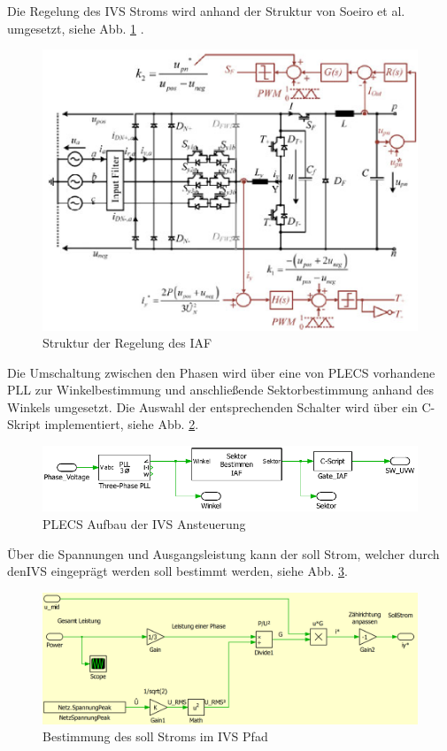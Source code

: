 		Die Regelung des \gls{IVS} Stroms wird anhand der Struktur von Soeiro et al. umgesetzt, siehe Abb. \ref{fig:iafpapercontrol} \cite{Soeiro.2013}. 
		 \begin{figure}[H]
			\centering
			\includegraphics[width=0.7\linewidth]{content/Grafiken/IAF_Paper_Control}
			\caption{Struktur der Regelung des IAF \cite{Soeiro.2013}}
			\label{fig:iafpapercontrol}
		\end{figure}
		Die Umschaltung zwischen den Phasen wird über eine von \gls{PLECS} vorhandene \gls{PLL} zur Winkelbestimmung und anschließende Sektorbestimmung anhand des Winkels umgesetzt. Die Auswahl der entsprechenden Schalter wird über ein C-Skript implementiert, siehe Abb. \ref{fig:plecsiafivscontrol}. 
		\begin{figure}[H]
			\centering
			\includegraphics[width=1\linewidth]{content/Grafiken/PlecsIAFivscontrol}
			\caption{PLECS Aufbau der \gls{IVS} Ansteuerung}
			\label{fig:plecsiafivscontrol}
		\end{figure}
		Über die Spannungen und Ausgangsleistung kann der soll Strom, welcher durch den\gls{IVS} eingeprägt werden soll bestimmt werden, siehe Abb. \ref{fig:plecsiafivsi}.
		\begin{figure}
			\centering
			\includegraphics[width=1\linewidth]{content/Grafiken/PlecsIAFivsI}
			\caption{Bestimmung des soll Stroms im IVS Pfad}
			\label{fig:plecsiafivsi}
			
		\end{figure}

